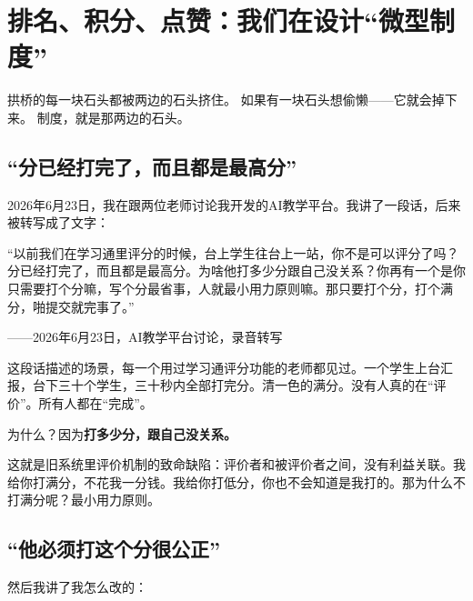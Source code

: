 
\chapter{排名、积分、点赞：我们在设计``微型制度''}

\vspace{0.5cm}

\begin{center}
{\small\color{muted} 拱桥的每一块石头都被两边的石头挤住。}
{\small\color{muted} 如果有一块石头想偷懒——它就会掉下来。}
{\small\color{muted} 制度，就是那两边的石头。}
\end{center}

\vspace{1cm}

\section{``分已经打完了，而且都是最高分''}

2026年6月23日，我在跟两位老师讨论我开发的AI教学平台。我讲了一段话，后来被转写成了文字：

\begin{shiyu-inline}
``以前我们在学习通里评分的时候，台上学生往台上一站，你不是可以评分了吗？分已经打完了，而且都是最高分。为啥他打多少分跟自己没关系？你再有一个是你只需要打个分嘛，写个分最省事，人就最小用力原则嘛。那只要打个分，打个满分，啪提交就完事了。''

\hfill ——2026年6月23日，AI教学平台讨论，录音转写
\end{shiyu-inline}

这段话描述的场景，每一个用过学习通评分功能的老师都见过。一个学生上台汇报，台下三十个学生，三十秒内全部打完分。清一色的满分。没有人真的在``评价''。所有人都在``完成''。

为什么？因为\textbf{打多少分，跟自己没关系。}

这就是旧系统里评价机制的致命缺陷：评价者和被评价者之间，没有利益关联。我给你打满分，不花我一分钱。我给你打低分，你也不会知道是我打的。那为什么不打满分呢？最小用力原则。

\section{``他必须打这个分很公正''}

然后我讲了我怎么改的：

